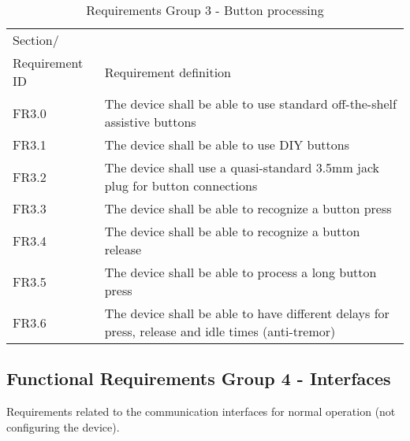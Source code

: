 \documentclass[]{scrreprt}%
\begin{document}
\begin{table}[htb!]
 \centering
 \caption{Requirements Group 3 - Button processing}
\label{req_group3}
 \begin{tabularx}{\textwidth}{|l|X|} \hline
 Section/\\ Requirement ID & Requirement definition\\ \hline  \hline
 FR3.0 & The device shall be able to use standard off-the-shelf assistive buttons \\ \hline
 FR3.1 & The device shall be able to use DIY buttons \\ \hline
 FR3.2 & The device shall use a quasi-standard 3.5mm jack plug for button connections \\ \hline
 FR3.3 & The device shall be able to recognize a button press\\ \hline
 FR3.4 & The device shall be able to recognize a button release\\ \hline
 FR3.5 & The device shall be able to process a long button press\\ \hline
 FR3.6 & The device shall be able to have different delays for press, release and idle times (anti-tremor)\\ \hline
 \end{tabularx}
\end{table}
 

\subsection{Functional Requirements Group 4 - Interfaces}

Requirements related to the communication interfaces for normal operation (not configuring the device).
\end{document}
